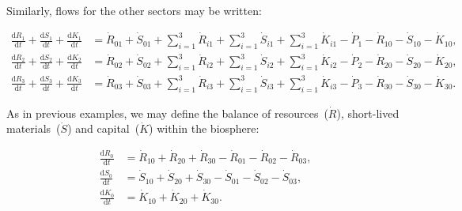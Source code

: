 Similarly, flows for the other sectors may be written:

\begin{align} \label{eq:C_CV_1}
	\frac{\mathrm{d}R_{1}}{\mathrm{d}t} 
	+ \frac{\mathrm{d}S_{1}}{\mathrm{d}t}	
	+ \frac{\mathrm{d}K_{1}}{\mathrm{d}t}		
	& =  \dot{R}_{01} 
	+ \dot{S}_{01}
	+ \sum_{i = 1}^{3}\dot{R}_{i1}
	+ \sum_{i = 1}^{3}\dot{S}_{i1}
	+ \sum_{i = 1}^{3}\dot{K}_{i1}
	- \dot{P}_{1}
	- \dot{R}_{10} 
	- \dot{S}_{10}
	- \dot{K}_{10},										\\
	\label{eq:C_CV_2}
	\frac{\mathrm{d}R_{2}}{\mathrm{d}t} 
	+ \frac{\mathrm{d}S_{2}}{\mathrm{d}t}	
	+ \frac{\mathrm{d}K_{2}}{\mathrm{d}t}		
	& =  \dot{R}_{02} 
	+ \dot{S}_{02}
	+ \sum_{i = 1}^{3}\dot{R}_{i2}
	+ \sum_{i = 1}^{3}\dot{S}_{i2}
	+ \sum_{i = 1}^{3}\dot{K}_{i2}
	- \dot{P}_{2}
	- \dot{R}_{20} 
	- \dot{S}_{20}
	- \dot{K}_{20},										\\	
	\label{eq:C_CV_3}
	\frac{\mathrm{d}R_{3}}{\mathrm{d}t} 
	+ \frac{\mathrm{d}S_{3}}{\mathrm{d}t}	
	+ \frac{\mathrm{d}K_{3}}{\mathrm{d}t}		
	& =  \dot{R}_{03} 
	+ \dot{S}_{03}
	+ \sum_{i = 1}^{3}\dot{R}_{i3}
	+ \sum_{i = 1}^{3}\dot{S}_{i3}
	+ \sum_{i = 1}^{3}\dot{K}_{i3}
	- \dot{P}_{3}
	- \dot{R}_{30} 
	- \dot{S}_{30}
	- \dot{K}_{30}.										
\end{align}

%

As in previous examples,
we may define the balance of 
resources~($\dot{R}$),
short-lived materials~($\dot{S}$) and
capital~($\dot{K}$) within the biosphere:

\begin{align}\label{eq:C_dR0}
	\frac{\mathrm{d}R_{0}}{\mathrm{d}t}	&
	= \dot{R}_{10}
	+ \dot{R}_{20}
	+ \dot{R}_{30}
	- \dot{R}_{01}
	- \dot{R}_{02}
	- \dot{R}_{03},										\\
\label{eq:C_dS0}
	\frac{\mathrm{d}S_{0}}{\mathrm{d}t}	&
	= \dot{S}_{10}
	+ \dot{S}_{20}
	+ \dot{S}_{30}	
	- \dot{S}_{01}
	- \dot{S}_{02}
	- \dot{S}_{03},										\\	
\label{eq:C_dK0}
	\frac{\mathrm{d}K_{0}}{\mathrm{d}t}	&
	= \dot{K}_{10}
	+ \dot{K}_{20}
	+ \dot{K}_{30}.
\end{align}

